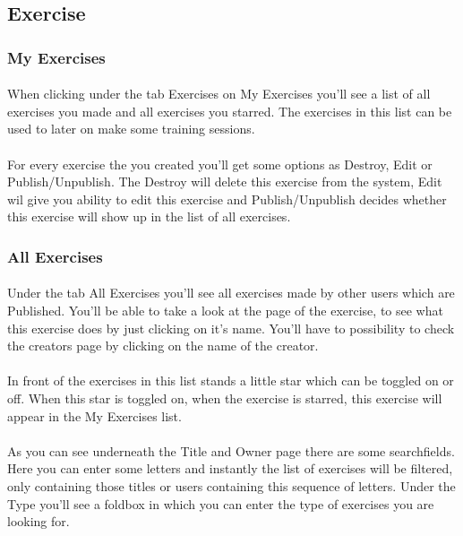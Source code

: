 \documentclass[11pt,a4paper]{scrartcl}
\begin{document}
\subsection{Exercise}
\subsubsection{My Exercises}
\paragraph{}When clicking under the tab Exercises on My Exercises you'll see a list of all exercises you made and all exercises you starred. The exercises in this list can be used to later on make some training sessions.
\paragraph{}For every exercise the you created you'll get some options as Destroy, Edit or Publish/Unpublish. The Destroy will delete this exercise from the system, Edit wil give you ability to edit this exercise and Publish/Unpublish decides whether this exercise will show up in the list of all exercises.
\subsubsection{All Exercises}
\paragraph{}Under the tab All Exercises you'll see all exercises made by other users which are Published. You'll be able to take a look at the page of the exercise, to see what this exercise does by just clicking on it's name. You'll have to possibility to check the creators page by clicking on the name of the creator.
\paragraph{}In front of the exercises in this list stands a little star which can be toggled on or off. When this star is toggled on, when the exercise is starred, this exercise will appear in the My Exercises list.
\paragraph{}As you can see underneath the Title and Owner page there are some searchfields. Here you can enter some letters and instantly the list of exercises will be filtered, only containing those titles or users containing this sequence of letters. Under the Type you'll see a foldbox in which you can enter the type of exercises you are looking for.
\end{document}
